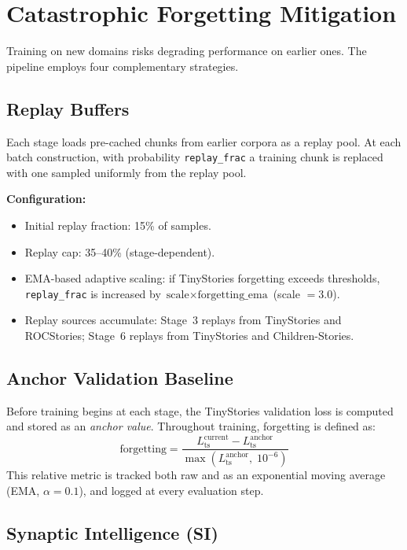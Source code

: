 \section{Catastrophic Forgetting Mitigation}

Training on new domains risks degrading performance on earlier ones.  The
pipeline employs four complementary strategies.

\subsection{Replay Buffers}

Each stage loads pre-cached chunks from earlier corpora as a replay pool.  At
each batch construction, with probability \texttt{replay\_frac} a training
chunk is replaced with one sampled uniformly from the replay pool.

\textbf{Configuration:}
\begin{itemize}[nosep]
  \item Initial replay fraction: 15\% of samples.
  \item Replay cap: 35--40\% (stage-dependent).
  \item EMA-based adaptive scaling: if TinyStories forgetting exceeds
        thresholds, \texttt{replay\_frac} is increased by
        $\text{scale} \times \text{forgetting\_ema}$ (scale $= 3.0$).
  \item Replay sources accumulate: Stage~3 replays from TinyStories and
        ROCStories; Stage~6 replays from TinyStories and Children-Stories.
\end{itemize}

\subsection{Anchor Validation Baseline}

Before training begins at each stage, the TinyStories validation loss is
computed and stored as an \emph{anchor value}.  Throughout training,
forgetting is defined as:
\[
\text{forgetting} = \frac{L_\text{ts}^\text{current} - L_\text{ts}^\text{anchor}}
                         {\max(L_\text{ts}^\text{anchor},\; 10^{-6})}
\]
This relative metric is tracked both raw and as an exponential moving average
(EMA, $\alpha = 0.1$), and logged at every evaluation step.

\subsection{Synaptic Intelligence (SI)}

